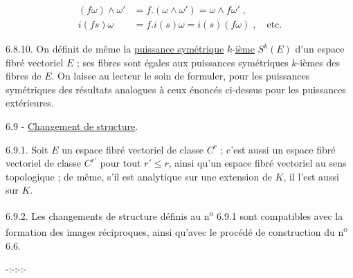 \[
\begin{aligned}
(f\omega)\wedge\omega'&=f.(\omega\wedge\omega')=\omega\wedge f\omega'\;,\\
i(fs)\omega&=f.i(s)\omega=i(s)(f\omega)\;,\quad\text{etc.}
\end{aligned}
\]

6.8.10. On définit de même la \uline{puissance symétrique} $k$-\uline{ième} $S^k(E)$ d'un espace fibré vectoriel $E$ ; ses fibres sont égales aux puissances symétriques $k$-ièmes des fibres de $E$. On laisse au lecteur le soin de formuler, pour les puissances symétriques des résultats analogues à ceux énoncés ci-dessus pour les puissances extérieures.

6.9 - \uline{Changement de structure}.

6.9.1. Soit $E$ un espace fibré vectoriel de classe $C^r$ ; c'est aussi un espace fibré vectoriel de classe $C^{r'}$ pour tout $r'\leq r$, ainsi qu'un espace fibré vectoriel au sens topologique ; de même, s'il est analytique sur une extension de $K$, il l'est aussi sur $K$.

6.9.2. Les changements de structure définis au n\textsuperscript{o} 6.9.1 sont compatibles avec la formation des images réciproques, ainsi qu'avec le \hspace{3em}procédé de construction du n\textsuperscript{o} 6.6.

\begin{center}-:-:-:-\end{center}
